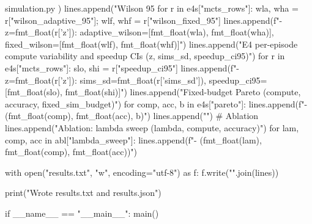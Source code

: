 \begin{filecontents*}{simulation.py}
        )
    lines.append("Wilson 95%
    for r in e4s["mcts_rows"]:
        wla, wha = r["wilson_adaptive_95"]; wlf, whf = r["wilson_fixed_95"]
        lines.append(f"- z={fmt_float(r['z'])}: adaptive_wilson=[{fmt_float(wla)}, {fmt_float(wha)}], fixed_wilson=[{fmt_float(wlf)}, {fmt_float(whf)}]")
    lines.append("E4 per-episode compute variability and speedup CIs (z, sims_sd, speedup_ci95)")
    for r in e4s["mcts_rows"]:
        slo, shi = r["speedup_ci95"]
        lines.append(f"- z={fmt_float(r['z'])}: sims_sd={fmt_float(r['sims_sd'])}, speedup_ci95=[{fmt_float(slo)}, {fmt_float(shi)}]")
    lines.append("Fixed-budget Pareto (compute, accuracy, fixed_sim_budget)")
    for comp, acc, b in e4s["pareto"]:
        lines.append(f"- ({fmt_float(comp)}, {fmt_float(acc)}, {b})")
    lines.append("")
    # Ablation
    lines.append("Ablation: lambda sweep (lambda, compute, accuracy)")
    for lam, comp, acc in abl["lambda_sweep"]:
        lines.append(f"- ({fmt_float(lam)}, {fmt_float(comp)}, {fmt_float(acc)})")

    with open("results.txt", "w", encoding="utf-8") as f:
        f.write("\n".join(lines))

    print("Wrote results.txt and results.json")


if __name__ == "__main__":
    main()
\end{filecontents*}
\documentclass[10pt]{article}

\usepackage[T1]{fontenc}
\usepackage{lmodern}
\usepackage[margin=1in]{geometry}
\usepackage{microtype}
\usepackage{booktabs}
\usepackage{amsmath, amssymb, mathtools, bm}
\usepackage[dvipsnames]{xcolor}
\usepackage{float}
\usepackage{caption}
\usepackage{url}
\usepackage{hyperref}
\usepackage{enumitem}
\usepackage{adjustbox}
\usepackage[ruled,vlined,linesnumbered]{algorithm2e}
\usepackage{tikz}
\usepackage{pgfplots}
\pgfplotsset{compat=1.18}

\hypersetup{
  colorlinks=true,
  linkcolor=MidnightBlue,
  citecolor=MidnightBlue,
  urlcolor=MidnightBlue
}

\newcommand{\E}{\mathbb{E}}
\newcommand{\KL}{\mathrm{KL}}
\newcommand{\Var}{\mathrm{Var}}
\newcommand{\softmax}{\mathrm{softmax}}
\newcommand{\entropy}{\mathcal{H}}
\newcommand{\marginGap}{\Delta}
\newcommand{\tick}{\textsf{tick}}
\newcommand{\TickAPI}{\textsc{Tick-API}}
\newcommand{\model}{\textsc{Net}}
\newcommand{\budget}{\mathcal{B}}
\newcommand{\cost}{\mathsf{cost}}
\newcommand{\gain}{\widehat{\Delta}}

